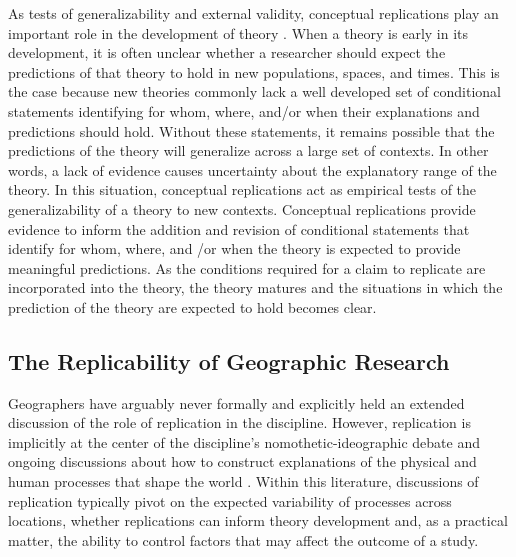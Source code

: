 \documentclass[]{interact}
\theoremstyle{plain}%
\theoremstyle{definition}
\theoremstyle{remark}
\begin{document}
As tests of generalizability and external validity, conceptual replications play an important role in the development of theory \citep{earp2015, haig2022, irvine2021}.
When a theory is early in its development, it is often unclear whether a researcher should expect the predictions of that theory to hold in new populations, spaces, and times.
This is the case because new theories commonly lack a well developed set of conditional statements identifying for whom, where, and/or when their explanations and predictions should hold. 
Without these statements, it remains possible that the predictions of the theory will generalize across a large set of contexts. 
In other words, a lack of evidence causes uncertainty about the explanatory range of the theory.
In this situation, conceptual replications act as empirical tests of the generalizability of a theory to new contexts. 
Conceptual replications provide evidence to inform the addition and revision of conditional statements that identify for whom, where, and /or when the theory is expected to provide meaningful predictions.
As the conditions required for a claim to replicate are incorporated into the theory, the theory matures and the situations in which the prediction of the theory are expected to hold becomes clear.

\subsection*{The Replicability of Geographic Research}
Geographers have arguably never formally and explicitly held an extended discussion of the role of replication in the discipline.
However, replication is implicitly at the center of the discipline's nomothetic-ideographic debate \citep{kedron2022replication, sui2021reproducibility} and ongoing discussions about how to construct explanations of the physical and human processes that shape the world \citep[see][]{harvey1969, inkpen2013science, miller2015data, sayer1992method, yeung2019rethinking, yeung2023theory}. 
Within this literature, discussions of replication typically pivot on the expected variability of processes across locations, whether replications can inform theory development and, as a practical matter, the ability to control factors that may affect the outcome of a study. 
\end{document}
